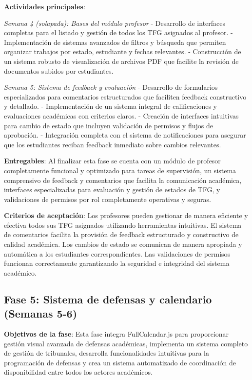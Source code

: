 \documentclass[12pt,a4paper,oneside]{report}
\begin{document}
\textbf{Actividades principales}:

\emph{Semana 4 (solapada): Bases del módulo profesor} - Desarrollo de interfaces completas para el listado y gestión de todos los TFG asignados al profesor. - Implementación de sistemas avanzados de filtros y búsqueda que permiten organizar trabajos por estado, estudiante y fechas relevantes. - Construcción de un sistema robusto de visualización de archivos PDF que facilite la revisión de documentos subidos por estudiantes.

\emph{Semana 5: Sistema de feedback y evaluación} - Desarrollo de formularios especializados para comentarios estructurados que faciliten feedback constructivo y detallado. - Implementación de un sistema integral de calificaciones y evaluaciones académicas con criterios claros. - Creación de interfaces intuitivas para cambio de estado que incluyen validación de permisos y flujos de aprobación. - Integración completa con el sistema de notificaciones para asegurar que los estudiantes reciban feedback inmediato sobre cambios relevantes.

\textbf{Entregables}: Al finalizar esta fase se cuenta con un módulo de profesor completamente funcional y optimizado para tareas de supervisión, un sistema comprensivo de feedback y comentarios que facilita la comunicación académica, interfaces especializadas para evaluación y gestión de estados de TFG, y validaciones de permisos por rol completamente operativas y seguras.

\textbf{Criterios de aceptación}: Los profesores pueden gestionar de manera eficiente y efectiva todos sus TFG asignados utilizando herramientas intuitivas. El sistema de comentarios facilita la provisión de feedback estructurado y constructivo de calidad académica. Los cambios de estado se comunican de manera apropiada y automática a los estudiantes correspondientes. Las validaciones de permisos funcionan correctamente garantizando la seguridad e integridad del sistema académico.

\subsection{Fase 5: Sistema de defensas y calendario (Semanas
5-6)}\label{fase-5-sistema-de-defensas-y-calendario-semanas-5-6}

\textbf{Objetivos de la fase}: Esta fase integra FullCalendar.js para proporcionar gestión visual avanzada de defensas académicas, implementa un sistema completo de gestión de tribunales, desarrolla funcionalidades intuitivas para la programación de defensas y crea un sistema automatizado de coordinación de disponibilidad entre todos los actores académicos.
\end{document}
